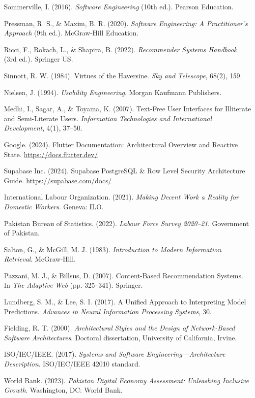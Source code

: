 \documentclass[12pt,a4paper]{article}
\begin{document}
\begin{list}{}{\setlength{\leftmargin}{0pt}\setlength{\itemindent}{0pt}\setlength{\itemsep}{6pt}\setlength{\parsep}{0pt}}
\item Sommerville, I. (2016). \textit{Software Engineering} (10th ed.). Pearson Education.
\item Pressman, R. S., \& Maxim, B. R. (2020). \textit{Software Engineering: A Practitioner's Approach} (9th ed.). McGraw-Hill Education.
\item Ricci, F., Rokach, L., \& Shapira, B. (2022). \textit{Recommender Systems Handbook} (3rd ed.). Springer US.
\item Sinnott, R. W. (1984). Virtues of the Haversine. \textit{Sky and Telescope}, 68(2), 159.
\item Nielsen, J. (1994). \textit{Usability Engineering}. Morgan Kaufmann Publishers.
\item Medhi, I., Sagar, A., \& Toyama, K. (2007). Text-Free User Interfaces for Illiterate and Semi-Literate Users. \textit{Information Technologies and International Development}, 4(1), 37--50.
\item Google. (2024). Flutter Documentation: Architectural Overview and Reactive State. \url{https://docs.flutter.dev/}
\item Supabase Inc. (2024). Supabase PostgreSQL \& Row Level Security Architecture Guide. \url{https://supabase.com/docs/}
\item International Labour Organization. (2021). \textit{Making Decent Work a Reality for Domestic Workers}. Geneva: ILO.
\item Pakistan Bureau of Statistics. (2022). \textit{Labour Force Survey 2020--21}. Government of Pakistan.
\item Salton, G., \& McGill, M. J. (1983). \textit{Introduction to Modern Information Retrieval}. McGraw-Hill.
\item Pazzani, M. J., \& Billsus, D. (2007). Content-Based Recommendation Systems. In \textit{The Adaptive Web} (pp. 325--341). Springer.
\item Lundberg, S. M., \& Lee, S. I. (2017). A Unified Approach to Interpreting Model Predictions. \textit{Advances in Neural Information Processing Systems}, 30.
\item Fielding, R. T. (2000). \textit{Architectural Styles and the Design of Network-Based Software Architectures}. Doctoral dissertation, University of California, Irvine.
\item ISO/IEC/IEEE. (2017). \textit{Systems and Software Engineering---Architecture Description}. ISO/IEC/IEEE 42010 standard.
\item World Bank. (2023). \textit{Pakistan Digital Economy Assessment: Unleashing Inclusive Growth}. Washington, DC: World Bank.
\end{list}
\end{document}
